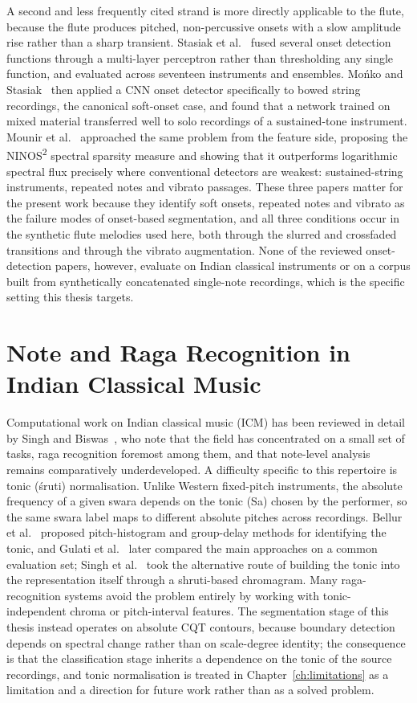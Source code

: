 A second and less frequently cited strand is more directly applicable to the flute, because the flute produces pitched, non-percussive onsets with a slow amplitude rise rather than a sharp transient. Stasiak et al.~\cite{ref22} fused several onset detection functions through a multi-layer perceptron rather than thresholding any single function, and evaluated across seventeen instruments and ensembles. Mo\'{n}ko and Stasiak~\cite{ref23} then applied a CNN onset detector specifically to bowed string recordings, the canonical soft-onset case, and found that a network trained on mixed material transferred well to solo recordings of a sustained-tone instrument. Mounir et al.~\cite{ref24} approached the same problem from the feature side, proposing the NINOS\textsuperscript{2} spectral sparsity measure and showing that it outperforms logarithmic spectral flux precisely where conventional detectors are weakest: sustained-string instruments, repeated notes and vibrato passages. These three papers matter for the present work because they identify soft onsets, repeated notes and vibrato as the failure modes of onset-based segmentation, and all three conditions occur in the synthetic flute melodies used here, both through the slurred and crossfaded transitions and through the vibrato augmentation. None of the reviewed onset-detection papers, however, evaluate on Indian classical instruments or on a corpus built from synthetically concatenated single-note recordings, which is the specific setting this thesis targets.

\section{Note and Raga Recognition in Indian Classical Music}
\label{sec:icm}

Computational work on Indian classical music (ICM) has been reviewed in detail by Singh and Biswas~\cite{ref25}, who note that the field has concentrated on a small set of tasks, raga recognition foremost among them, and that note-level analysis remains comparatively underdeveloped. A difficulty specific to this repertoire is tonic (\'{s}ruti) normalisation. Unlike Western fixed-pitch instruments, the absolute frequency of a given swara depends on the tonic (Sa) chosen by the performer, so the same swara label maps to different absolute pitches across recordings. Bellur et al.~\cite{ref26} proposed pitch-histogram and group-delay methods for identifying the tonic, and Gulati et al.~\cite{ref27} later compared the main approaches on a common evaluation set; Singh et al.~\cite{ref28} took the alternative route of building the tonic into the representation itself through a shruti-based chromagram. Many raga-recognition systems avoid the problem entirely by working with tonic-independent chroma or pitch-interval features. The segmentation stage of this thesis instead operates on absolute CQT contours, because boundary detection depends on spectral change rather than on scale-degree identity; the consequence is that the classification stage inherits a dependence on the tonic of the source recordings, and tonic normalisation is treated in Chapter~\ref{ch:limitations} as a limitation and a direction for future work rather than as a solved problem.

